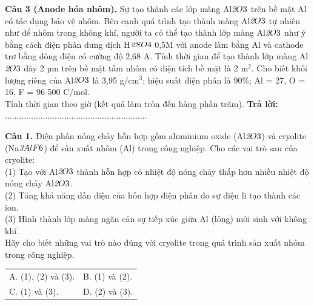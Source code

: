 \documentclass{article}
\begin{document}
\fontsize{24}{32}\selectfont
\textbf{Câu 3 (Anode hóa nhôm).} Sự tạo thành các lớp màng Al$\textit{{\text{2}}$O$}{\text{3}}$ trên bề mặt Al có tác dụng bảo vệ nhôm. Bên cạnh quá trình tạo thành màng Al$\textit{{\text{2}}$O$}{\text{3}}$ tự nhiên như để nhôm trong không khí, người ta có thể tạo thành lớp màng Al$\textit{{\text{2}}$O$}{\text{3}}$ như ý bằng cách điện phân dung dịch H$\textit{{\text{2}}$SO$}{\text{4}}$ 0,5M với anode làm bằng Al và cathode trơ bằng dòng điện có cường độ 2,68 A. Tính thời gian để tạo thành lớp màng Al$\textit{{\text{2}}$O$}{\text{3}}$ dày 2 µm trên bề mặt tấm nhôm có diện tích bề mặt là 2 m$^{\text{2}}$. Cho biết khối lượng riêng của Al$\textit{{\text{2}}$O$}{\text{3}}$ là 3,95 g/cm$^{\text{3}}$; hiệu suất điện phân là 90\%; Al = 27, O = 16, F = 96 500 C/mol.\\ 
Tính thời gian theo giờ (kết quả làm tròn đến hàng phần trăm).
\vspace{12pt}
\textbf{Trả lời:} $\dots\dots\dots\dots\dots\dots\dots\dots\dots\dots\dots\dots\dots\dots\dots\dots\dots\dots\dots\dots$
\vspace*{\fill}
\newpage

\fontsize{24}{32}\selectfont
\textbf{Câu 1.} Điện phân nóng chảy hỗn hợp gồm aluminium oxide (Al$\textit{{\text{2}}$O$}{\text{3}}$) và cryolite (Na$\textit{{\text{3}}$AlF$}{\text{6}}$) để sản xuất nhôm (Al) trong công nghiệp. Cho các vai trò sau của cryolite:\\ 
(1) Tạo với Al$\textit{{\text{2}}$O$}{\text{3}}$ thành hỗn hợp có nhiệt độ nóng chảy thấp hơn nhiều nhiệt độ nóng chảy Al$\textit{{\text{2}}$O$}{\text{3}}$.\\ 
(2) Tăng khả năng dẫn điện của hỗn hợp điện phân do sự điện li tạo thành các ion.\\ 
(3) Hình thành lớp màng ngăn cản sự tiếp xúc giữa Al (lỏng) mới sinh với không khí.\\ 
Hãy cho biết những vai trò nào đúng với cryolite trong quá trình sản xuất nhôm trong công nghiệp.
\vspace{10pt}
\begin{tabularx}{\linewidth}{@{}X X@{}}
A. (1), (2) và (3). & B. (1) và (2).\\[8pt]
C. (1) và (3). & D. (2) và (3).
\end{tabularx}
\vspace*{\fill}
\newpage
\end{document}

